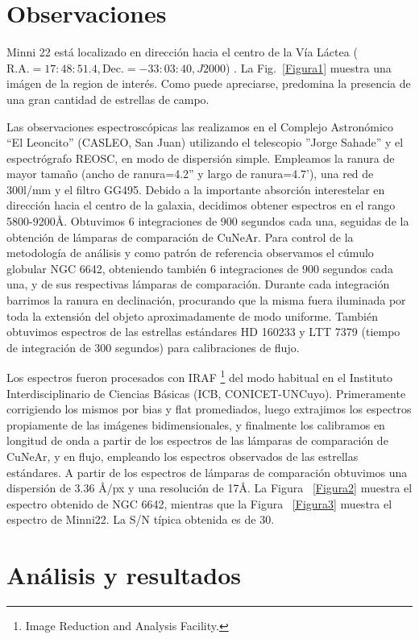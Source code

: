 \documentclass[baaa]{baaa}
\begin{document}
\section{Observaciones}

Minni 22 está localizado en dirección hacia el centro de la Vía Láctea ($\mathrm{R.A.}= 17:48:51.4, \mathrm{Dec.}= -33:03:40, J2000$) \citep{minniti-2018}. La Fig.~\ref{Figura1} muestra una imágen de la region de interés. Como puede apreciarse, predomina la presencia de una gran cantidad de estrellas de campo.

Las observaciones espectroscópicas las realizamos en el Complejo Astronómico “El Leoncito” (CASLEO, San Juan) utilizando el telescopio ''Jorge Sahade'' y el espectrógrafo REOSC, en modo de dispersión simple. Empleamos la ranura de mayor tamaño (ancho de ranura=4.2'' y largo de ranura=4.7’), una red de 300l/mm y el filtro GG495. Debido a la importante absorción interestelar en dirección hacia el centro de la galaxia, decidimos obtener espectros en el rango 5800-9200\r{A}. Obtuvimos 6 integraciones de 900 segundos cada una, seguidas de la obtención de lámparas de comparación de CuNeAr. Para control de la metodología de análisis y como patrón de referencia observamos el cúmulo globular NGC 6642, obteniendo también 6 integraciones de 900 segundos cada una, y de sus respectivas lámparas de comparación. Durante cada integración barrimos la ranura en declinación, procurando que la misma fuera iluminada por toda la extensión del objeto aproximadamente de modo uniforme. También obtuvimos espectros de las estrellas estándares HD 160233 y LTT 7379 (tiempo de integración de 300 segundos) para calibraciones de flujo.

Los espectros fueron procesados con {\sc IRAF} \footnote{Image Reduction and Analysis Facility.} del modo habitual en el Instituto Interdisciplinario de Ciencias Básicas (ICB, CONICET-UNCuyo). Primeramente corrigiendo los mismos por bias y flat promediados, luego extrajimos los espectros propiamente de las imágenes bidimensionales, y finalmente los calibramos en longitud de onda a partir de los espectros de las lámparas de comparación de CuNeAr, y en flujo, empleando los espectros observados de las estrellas estándares. A partir de los espectros de lámparas de comparación obtuvimos una dispersión de 3.36 \AA/px y una resolución de 17\AA. La Figura ~\ref{Figura2} muestra el espectro obtenido de NGC 6642, mientras que la Figura ~\ref{Figura3} muestra el espectro de Minni22. La S/N típica obtenida es de 30.

\section{Análisis y resultados}
\end{document}
